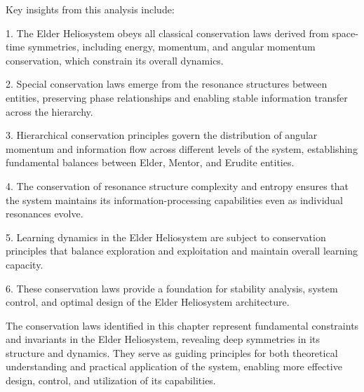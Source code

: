 Key insights from this analysis include:

1. The Elder Heliosystem obeys all classical conservation laws derived from space-time symmetries, including energy, momentum, and angular momentum conservation, which constrain its overall dynamics.

2. Special conservation laws emerge from the resonance structures between entities, preserving phase relationships and enabling stable information transfer across the hierarchy.

3. Hierarchical conservation principles govern the distribution of angular momentum and information flow across different levels of the system, establishing fundamental balances between Elder, Mentor, and Erudite entities.

4. The conservation of resonance structure complexity and entropy ensures that the system maintains its information-processing capabilities even as individual resonances evolve.

5. Learning dynamics in the Elder Heliosystem are subject to conservation principles that balance exploration and exploitation and maintain overall learning capacity.

6. These conservation laws provide a foundation for stability analysis, system control, and optimal design of the Elder Heliosystem architecture.

The conservation laws identified in this chapter represent fundamental constraints and invariants in the Elder Heliosystem, revealing deep symmetries in its structure and dynamics. They serve as guiding principles for both theoretical understanding and practical application of the system, enabling more effective design, control, and utilization of its capabilities.